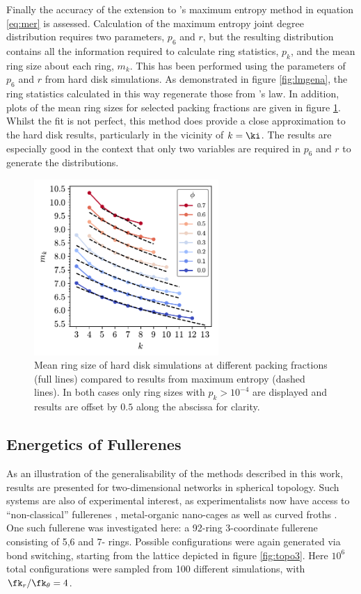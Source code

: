 Finally the accuracy of the extension to \lm's maximum entropy method in equation \eqref{eq:mer} is assessed.
Calculation of the maximum entropy joint degree distribution requires two parameters, $p_6$ and $r$, but the resulting distribution contains all the information required to calculate ring statistics, $p_k$, and the mean ring size about each ring, $m_k$.
This has been performed using the parameters of $p_6$ and $r$ from hard disk simulations.
As demonstrated in figure \ref{fig:lmgena}, the ring statistics calculated in this way regenerate those from \lm's law.
In addition, plots of the mean ring sizes for selected packing fractions are given in figure \ref{fig:hdme}. Whilst the fit is not perfect, this method does provide a close approximation to the hard disk results, particularly in the vicinity of $k=\ki$. The results are especially good in the context that only two variables are required in $p_6$ and $r$ to generate the distributions.

\begin{figure}
\centering
        \includegraphics[width=7cm]{./figures/general_networks/hdme.pdf}
        \caption{Mean ring size of hard disk simulations at different packing fractions (full lines) compared to results from maximum entropy (dashed lines). In both cases only ring sizes with $p_k>10^{-4}$ are displayed and results are offset by $0.5$ along the abscissa for clarity.}
        \label{fig:hdme}
\end{figure}

\subsection{Energetics of Fullerenes}

As an illustration of the generalisability of the methods described in this work, results are presented for two\--dimensional networks in spherical topology.
Such systems are also of experimental interest, as experimentalists now have access to ``non-classical'' fullerenes \cite{Tian2019,Guan2019,Brotsman2017,Kemnitz2018}, metal-organic nano-cages \cite{Fujita2016,Wang2017} as well as curved froths \cite{Roth2012}.
One such fullerene was investigated here: a 92\--ring 3\--coordinate fullerene consisting of 5,6 and 7\-- rings.
Possible configurations were again generated via bond switching, starting from the lattice depicted in figure \ref{fig:topo3}.
Here $10^6$ total configurations were sampled from 100 different simulations, with $\fk_r/\fk_\theta=4$.

